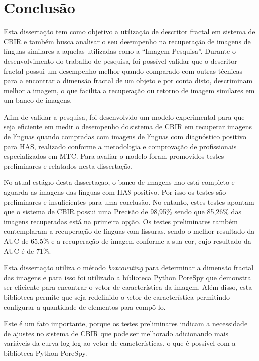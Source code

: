 \chapter{Conclusão}
\label{chap:conclusao}

Esta dissertação tem como objetivo a utilização de descritor fractal em sistema de CBIR e também busca analisar o seu desempenho na recuperação de imagens de línguas similares a aquelas utilizadas como a “Imagem Pesquisa”. Durante o desenvolvimento do trabalho de pesquisa, foi possível validar que o descritor fractal possui um desempenho melhor quando comparado com outras técnicas para a encontrar a dimensão fractal de um objeto  e por conta disto, descriminam melhor a imagem, o que facilita a recuperação ou retorno de imagem similares em um banco de imagens.

Afim de validar a pesquisa, foi desenvolvido um modelo experimental para que seja eficiente em medir o desempenho do sistema de CBIR em recuperar imagens de línguas quando compradas com imagens de línguas com diagnóstico positivo para HAS, realizado conforme a metodologia e comprovação de profissionais especializados em MTC. Para avaliar o modelo foram promovidos testes preliminares e relatados nesta dissertação.

No atual estágio desta dissertação, o banco de imagens não está completo e aguarda as imagens das línguas com HAS positivo. Por isso os testes são preliminares e insuficientes para uma conclusão. No entanto, estes testes apontam que o sistema de CBIR possui uma Precisão de 98,95\% sendo que 85,26\% das imagens recuperadas está na primeira opção. Os testes preliminares também contemplaram a recuperação de línguas com fissuras, sendo o melhor resultado da AUC de 65,5\% e a recuperação de imagem conforme a sua cor, cujo resultado da AUC é de 71\%.

Esta dissertação utiliza o método \textit{boxcounting} para determinar a dimensão fractal das imagens e para isso foi utilizado a biblioteca Python PoreSpy que demonstra ser eficiente para encontrar o vetor de característica da imagem. Além disso, esta biblioteca permite que seja redefinido o vetor de característica permitindo configurar a quantidade de elementos para compô-lo. 

Este é um fato importante, porque os testes preliminares indicam a necessidade de ajustes no sistema de CBIR que pode ser melhorado adicionando mais variáveis da curva log-log ao vetor de características, o que é possível com a biblioteca Python PoreSpy.


